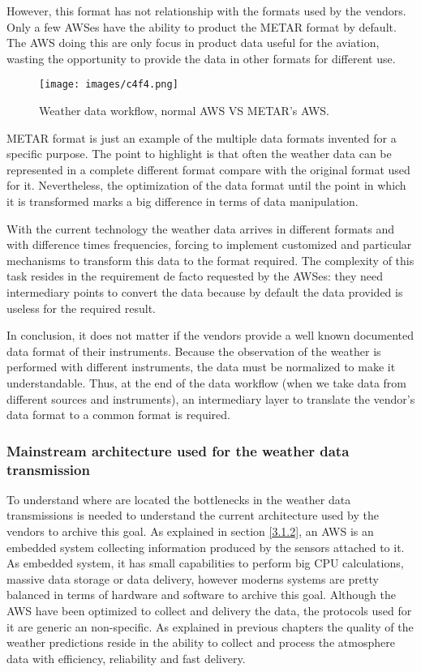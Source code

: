 However, this format has not relationship with the formats used by the vendors. Only a few \gls{AWS}es have the ability to product the \gls{METAR} format by default. The \gls{AWS} doing this are only focus in product data useful for the aviation, wasting the opportunity to provide the data in other formats for different use.

\begin{figure}[H]
\centerline{\texttt{[image: images/c4f4.png]}}
\caption{Weather data workflow, normal AWS VS METAR's AWS.}
\end{figure}

\gls{METAR} format is just an example of the multiple data formats invented for a specific purpose. The point to highlight is that often the weather data can be represented in a complete different format compare with the original format used for it. Nevertheless, the optimization of the data format until the point in which it is transformed marks a big difference in terms of data manipulation.

With the current technology the weather data arrives in different formats and with difference times frequencies, forcing to implement customized and particular mechanisms to transform this data to the format required. The complexity of this task resides in the requirement de facto requested by the \gls{AWS}es: they need intermediary points to convert the data because by default the data provided is useless for the required result.

In conclusion, it does not matter if the vendors provide a well known documented data format of their instruments. Because the observation of the weather is performed with different instruments, the data must be normalized to make it understandable.
Thus, at the end of the data workflow (when we take data from different sources and instruments), an intermediary layer to translate the vendor's data format to a common format is required.

\subsubsection{Mainstream architecture used for the weather data transmission}

To understand where are located the bottlenecks in the weather data transmissions is needed to understand the current architecture used by the vendors to archive this goal. As explained in section \ref{3.1.2}, an \gls{AWS} is an embedded system collecting information produced by the sensors attached to it. As embedded system, it has small capabilities to perform big CPU calculations, massive data storage or data delivery, however moderns systems are pretty balanced in terms of hardware and software to archive this goal. Although the \gls{AWS} have been optimized to collect and delivery the data, the protocols used for it are generic an non-specific. As explained in previous chapters the quality of the weather predictions reside in the ability to collect and process the atmosphere data with efficiency, reliability and fast delivery.


